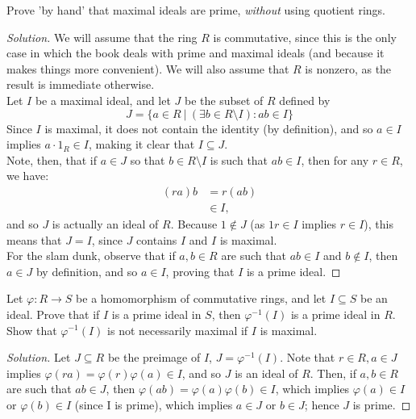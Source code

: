 \documentclass[12pt]{article}
\newenvironment{problem}[2][Problem]{\begin{trivlist}
\item[\hskip \labelsep {\bfseries #1}\hskip \labelsep {\bfseries #2.}]}{\end{trivlist}}
\newenvironment{solution}
  {\renewcommand\qedsymbol{$\blacksquare$}\begin{proof}[Solution]}
{\end{proof}}
\theoremstyle{remark}
\begin{document}
\begin{problem}{4.14}
  Prove 'by hand' that maximal ideals are prime, \textit{without} using 
  quotient rings.
\end{problem}
\begin{solution}
  We will assume that the ring $R$ is commutative, since this is the only case in which the book
  deals with prime and maximal ideals (and because it makes things more convenient).
  We will also assume that $R$ is nonzero, as the result is immediate otherwise. \\
  \indent Let $I$ be a maximal ideal, and let $J$ be the subset of $R$ defined by\\
  \begin{equation*}
    J = \{a\in R\ |\ (\exists b\in R\setminus I): ab\in I \}
  \end{equation*}
  \indent Since $I$ is maximal, it does not contain the identity (by definition), and so
  $a\in I$ implies $a\cdot1_R\in I$, making it clear that $I\subseteq J$. \\
  \indent Note, then, that if $a\in J$ so that $b\in R\setminus I$ is such that $ab\in I$,
  then for any $r\in R$, we have:
  \begin{align*}
    (ra)b &= r(ab) \\
    &\in I,
  \end{align*}
  and so $J$ is actually an ideal of $R$.
  Because $1\notin J$ (as $1r\in I$ implies $r\in I$), 
  this means that $J=I$, since $J$ contains $I$ 
  and $I$ is maximal.\\
  \indent For the slam dunk, observe that if $a,b\in R$ are such that $ab\in I$ and $b\notin I$,
  then $a\in J$ by definition, and so $a\in I$, proving that $I$ is a prime ideal.
\end{solution}

\begin{problem}{4.15}
  Let $\varphi:R\to S$ be a homomorphism of commutative rings, and let $I\subseteq S$
  be an ideal.
  Prove that if $I$ is a prime ideal in $S$, then $\varphi^{-1}(I)$ is a prime ideal in $R$.
  Show that $\varphi^{-1}(I)$ is not necessarily maximal if $I$ is maximal.
\end{problem}
\begin{solution}
  Let $J\subseteq R$ be the preimage of $I$, $J=\varphi^{-1}(I)$.
  Note that $r\in R, a\in J$ implies $\varphi(ra)=\varphi(r)\varphi(a)\in I$,
  and so $J$ is an ideal of $R$. 
  Then, if $a,b\in R$ are such that $ab\in J$, then
  $\varphi(ab)=\varphi(a)\varphi(b)\in I$, which implies $\varphi(a)\in I$
  or $\varphi(b)\in I$ (since I is prime), which implies $a\in J$ or $b\in J$; 
  hence $J$ is prime.
\end{solution}
\end{document}
